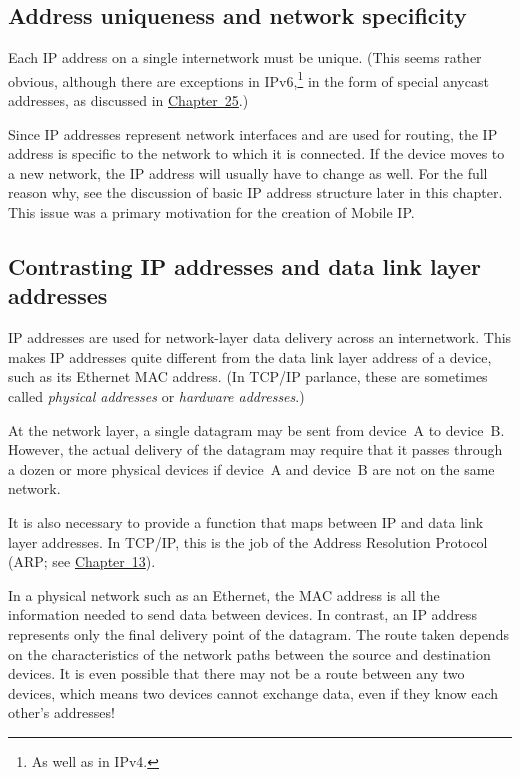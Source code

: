 \subsection{Address uniqueness and network specificity}

Each IP address on a single internetwork must be unique.
(This seems rather obvious, although there are exceptions in IPv6,\footnote{As well as in IPv4.} in the form of special anycast addresses, as discussed in \protect\hyperlink{ch25.html}{Chapter~25}.)

Since IP addresses represent network interfaces and are used for routing, the IP address is
specific to the network to which it is connected.
If the device moves to a new network, the IP address will usually have to change as well.
For the full reason why, see the discussion of basic IP address structure later in this chapter.
This issue was a primary motivation for the creation of Mobile IP.%



\subsection{Contrasting IP addresses and data link layer addresses}

IP addresses are used for network-layer data delivery across an internetwork. This
makes IP addresses quite different from the data link layer address of a
device, such as its Ethernet MAC address. (In TCP/IP parlance, these are
sometimes called \emph{physical addresses} or \emph{hardware addresses}.)

At the network layer, a single datagram may be sent from device~A to device~B.
However, the actual delivery of the datagram may require that it passes through a dozen or more physical devices if device~A and device~B are not on the same network.

It is also necessary to provide a function that maps between IP and data link layer addresses.
In TCP/IP, this is the job of the Address Resolution Protocol (ARP; see \protect\hyperlink{ch13.html}{Chapter~13}).

In a physical network such as an Ethernet, the MAC address is all the
information needed to send data between devices. In contrast, an IP
address represents only the final delivery point of the datagram. The
route taken depends on the characteristics of the network paths between
the source and destination devices. It is even possible that there may
not be a route between any two devices, which means two devices cannot
exchange data, even if they know each other's addresses!



